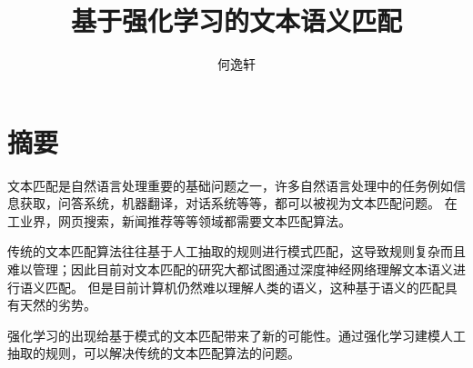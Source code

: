 \confidential{}%
\title{基于强化学习的文本语义匹配}%
\author{何逸轩}%
\maketitle
\makeenglishtitle
\makedeclaration
\chapter*{摘\quad 要}
\setcounter{page}{1}%

文本匹配是自然语言处理重要的基础问题之一，许多自然语言处理中的任务例如信息获取，问答系统，机器翻译，对话系统等等，都可以被视为文本匹配问题。
在工业界，网页搜索，新闻推荐等等领域都需要文本匹配算法。

传统的文本匹配算法往往基于人工抽取的规则进行模式匹配，这导致规则复杂而且难以管理；因此目前对文本匹配的研究大都试图通过深度神经网络理解文本语义进行语义匹配。
但是目前计算机仍然难以理解人类的语义，这种基于语义的匹配具有天然的劣势。

强化学习的出现给基于模式的文本匹配带来了新的可能性。通过强化学习建模人工抽取的规则，可以解决传统的文本匹配算法的问题。

